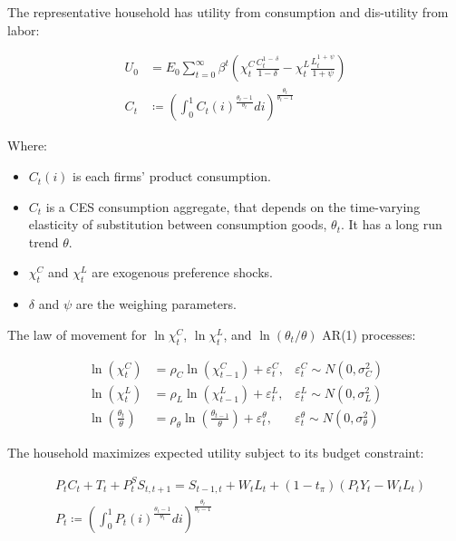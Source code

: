 \documentclass[12pt]{article}
\begin{document}
The representative household has utility from consumption and dis-utility from labor:

\begin{align*}
    U_{0} &=E_{0}\sum_{t=0}^{\infty}\beta^{t}\left(\chi_{t}^{C}\frac{C_{t}^{1\,-\,\delta}}{1-\delta}-\chi_{t}^{L}\frac{L_{t}^{1\,+\,\psi}}{1+\psi}\right)\\
    C_t &\coloneqq \left(\int_0^1C_t(i)^{\frac{\theta_t - 1}{\theta_t}} di\right)^{\frac{\theta_t}{\theta_t - 1}}
\end{align*}

Where:

\begin{itemize}
    \item $C_t(i)$ is each firms' product consumption.
    \item $C_t$ is a CES consumption aggregate, that depends on the time-varying elasticity of substitution between consumption goods, $\theta_t$. It has a long run trend $\theta$.
    \item $\chi_t^C$ and $\chi_t^L$ are exogenous preference shocks.
    \item $\delta$ and $\psi$ are the weighing parameters.
\end{itemize}

The law of movement for $\ln\chi_t^C$, $\ln\chi_t^L$, and $\ln(\theta_t/\theta)$ AR(1) processes:

\begin{align*}
    \ln(\chi_{t}^{C}) &=\rho_{C}\ln(\chi_{t-1}^{C})+\varepsilon_{t}^{C}, &\varepsilon_{t}^{C} \sim N(0, \sigma^2_C) \tag{1}\\
    \ln(\chi_{t}^{L}) &=\rho_{L}\ln(\chi_{t-1}^{L})+\varepsilon_{t}^{L}, &\varepsilon_{t}^{L} \sim N(0, \sigma^2_L) \tag{2}\\
    \ln\left(\frac{\theta_t}{\theta}\right) &= \rho_\theta \ln\left(\frac{\theta_{t-1}}{\theta}\right) + \varepsilon^\theta_t, &\varepsilon_{t}^{\theta} \sim N(0, \sigma^2_\theta) \tag{10}
\end{align*}

The household maximizes expected utility subject to its budget constraint:

\begin{align*}
    &P_tC_t + T_t + P^S_tS_{t,t+1} = S_{t-1,t} + W_tL_t + (1-t_\pi)(P_tY_t - W_tL_t) \tag{3}\\
    &P_t \coloneqq \left(\int_0^1P_t(i)^{\frac{\theta_t - 1}{\theta_t}} di\right)^{\frac{\theta_t}{\theta_t - 1}}
\end{align*}
\end{document}
